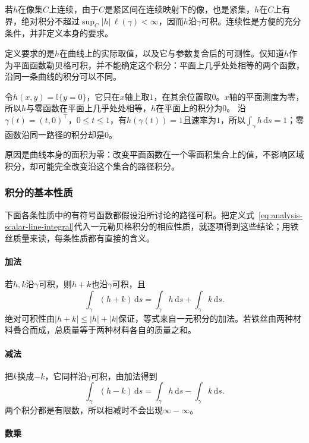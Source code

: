 若$h$在像集$C$上连续，由于$C$是紧区间在连续映射下的像，也是紧集，$h$在$C$上有界，绝对积分不超过$\sup_C|h|\,\ell(\gamma)<\infty$，因而$h$沿$\gamma$可积。连续性是方便的充分条件，并非定义本身的要求。

定义要求的是$h$在曲线上的实际取值，以及它与参数复合后的可测性。仅知道$h$作为平面函数勒贝格可积，并不能确定这个积分：平面上几乎处处相等的两个函数，沿同一条曲线的积分可以不同。
\begin{example}[平面积分为零而沿线段的积分为一]
令$h(x,y)=\mathbb I\{y=0\}$，它只在$x$轴上取$1$，在其余位置取$0$。$x$轴的平面测度为零，所以$h$与零函数在平面上几乎处处相等，$h$在平面上的积分为$0$。
沿$\gamma(t)=(t,0)^\top$，$0\leq t\leq1$，有$h(\gamma(t))=1$且速率为$1$，所以$\int_\gamma h\,\mathrm ds=1$；零函数沿同一路径的积分却是$0$。
\end{example}
原因是曲线本身的面积为零：改变平面函数在一个零面积集合上的值，不影响区域积分，却可能完全改变沿这个集合的路径积分。

\subsubsection{积分的基本性质}

下面各条性质中的有符号函数都假设沿所讨论的路径可积。把定义式~\eqref{eq:analysis-scalar-line-integral}代入一元勒贝格积分的相应性质，就逐项得到这些结论；用铁丝质量来读，每条性质都有直接的含义。

\paragraph{加法}

若$h,k$沿$\gamma$可积，则$h+k$也沿$\gamma$可积，且
\[
 \int_\gamma(h+k)\,\mathrm ds=\int_\gamma h\,\mathrm ds+\int_\gamma k\,\mathrm ds.
\]
绝对可积性由$|h+k|\leq|h|+|k|$保证，等式来自一元积分的加法。若铁丝由两种材料叠合而成，总质量等于两种材料各自的质量之和。

\paragraph{减法}

把$k$换成$-k$，它同样沿$\gamma$可积，由加法得到
\[
 \int_\gamma(h-k)\,\mathrm ds=\int_\gamma h\,\mathrm ds-\int_\gamma k\,\mathrm ds.
\]
两个积分都是有限数，所以相减时不会出现$\infty-\infty$。

\paragraph{数乘}

